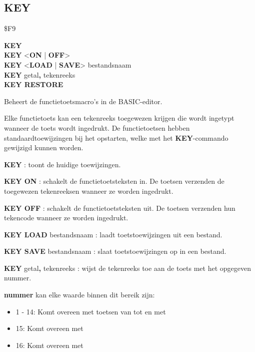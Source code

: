 
\newpage
\subsection{KEY}
\begin{description}[leftmargin=2cm,style=nextline]
\item [Token:]    \$F9

\item [Formaat:]   {\bf KEY} \\              {\bf KEY} <{\bf ON} | {\bf OFF}> \\                  {\bf KEY} <{\bf LOAD} | {\bf SAVE}> bestandsnaam \\                  {\bf KEY} getal{\bf,} tekenreeks \\                  {\bf KEY RESTORE}

\item [Gebruik:]    Beheert de functietoetsmacro's in de BASIC-editor.

                  Elke functietoets kan een tekenreeks toegewezen krijgen die wordt ingetypt wanneer de toets wordt ingedrukt. De functietoetsen hebben standaardtoewijzingen bij het opstarten, welke met het {\bf KEY}-commando gewijzigd kunnen worden.

                  {\bf KEY} : toont de huidige toewijzingen.

                  {\bf KEY ON} : schakelt de functietoetsteksten in. De toetsen verzenden de toegewezen tekenreeksen wanneer ze worden ingedrukt.

                  {\bf KEY OFF} : schakelt de functietoetsteksten uit. De toetsen verzenden hun tekencode wanneer ze worden ingedrukt.

{\bf KEY LOAD} bestandsnaam : laadt toetstoewijzingen uit een bestand.

{\bf KEY SAVE} bestandsnaam : slaat toetstoewijzingen op in een bestand.

                  {\bf KEY} getal{\bf,} tekenreeks : wijst de tekenreeks toe aan de toets met het opgegeven nummer.

                  {\bf nummer} kan elke waarde binnen dit bereik zijn:

                  \begin{itemize}
                     \item 1 - 14: Komt overeen met toetsen van  tot en met                      \item 15: Komt overeen met                      \item 16: Komt overeen met 
                  \end{itemize}


\end{description}
